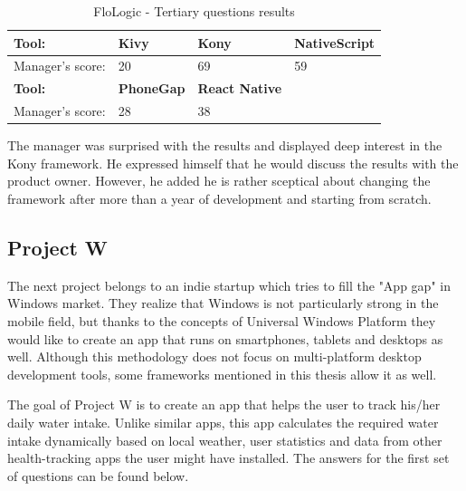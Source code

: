 \documentclass[english,master,public,dept460,male,cpdeclaration,oneside]{diploma}
\begin{document}
\begin{table}[!h]
\centering
\caption{FloLogic - Tertiary questions results}
	\begin{tabular}{p{4cm} | p{3cm} | p{3cm} | p{3cm}}
		\toprule		
		\textbf{Tool:} & \textbf{Kivy} & \textbf{Kony} & \textbf{NativeScript} \\
		\midrule
		Manager’s score: & 20 & 69 & 59 \\
		\midrule
		\textbf{Tool:} & \textbf{PhoneGap} & \textbf{React Native} & \\
		\midrule
		Manager’s score: & 28 & 38 & \\		
		\midrule
	\end{tabular}
\end{table}

The manager was surprised with the results and displayed deep interest in the Kony framework. He expressed himself that he would discuss the results with the product owner. However, he added he is rather sceptical about changing the framework after more than a year of development and starting from scratch.

\subsection{Project W}

The next project belongs to an indie startup which tries to fill the "App gap" in Windows market. They realize that Windows is not particularly strong in the mobile field, but thanks to the concepts of Universal Windows Platform they would like to create an app that runs on smartphones, tablets and desktops as well. Although this methodology does not focus on multi-platform desktop development tools, some frameworks mentioned in this thesis allow it as well.

The goal of Project W is to create an app that helps the user to track his/her daily water intake. Unlike similar apps, this app calculates the required water intake dynamically based on local weather, user statistics and data from other health-tracking apps the user might have installed. The answers for the first set of questions can be found below.
\end{document}
